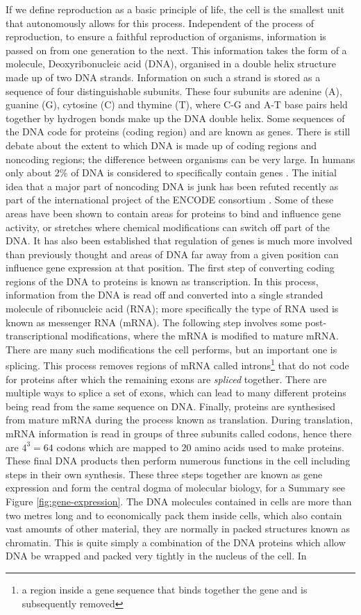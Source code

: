 If we define reproduction as a basic principle of life, the cell is the smallest unit that autonomously allows for this process. Independent of the process of reproduction, to ensure a faithful reproduction of organisms, information is passed on from one generation to the next. This information takes the form of a molecule, Deoxyribonucleic acid (DNA), organised in a double helix structure made up of two DNA strands. Information on such a strand is stored as a sequence of four distinguishable subunits. These four subunits are adenine (A), guanine (G), cytosine (C) and thymine (T), where C-G and A-T base pairs held together by hydrogen bonds make up the DNA double helix. Some sequences of the DNA code for proteins (coding region) and are known as genes.  There is still debate about the extent to which DNA is made up of coding regions and noncoding regions; the difference between organisms can be very large. In humans only about $2\%$ of DNA is considered to specifically contain genes \citep{Elgar:2008dm}. The initial idea that a major part of noncoding DNA is junk has been refuted recently as part of the international project of the ENCODE consortium \citep{Pennisi:2012wl}. Some of these areas have been shown to contain areas for proteins to bind and influence gene activity, or stretches where chemical modifications can  switch off part of the DNA. It has also been established that regulation of genes is much more involved than previously thought and areas of DNA far away from a given position can influence gene expression at that position. The first step of converting coding regions of the DNA to proteins is known as transcription. In this process, information from the DNA is read off and converted into a single stranded molecule of ribonucleic acid (RNA); more specifically the type of RNA used is known as messenger RNA (mRNA). The following step involves some post-transcriptional modifications, where the mRNA is modified to mature mRNA. There are many such modifications the cell performs, but an important one is splicing. This process removes regions of mRNA called introns\footnote{a region inside a gene sequence that binds together the gene and is subsequently removed} that do not code for proteins after which the remaining exons are \emph{spliced} together. There are multiple ways to splice a set of exons, which can lead to many different proteins being read from the same sequence on DNA. Finally, proteins are synthesised from mature mRNA during the process known as translation. During translation, mRNA information is read in groups of three subunits called codons, hence there are $4^3 = 64$ codons which are mapped to $20$ amino acids used to make proteins. These final DNA products then perform numerous functions in the cell including steps in their own synthesis. These three steps together are known as gene expression and form the central dogma of molecular biology, for a Summary see Figure \ref{fig:gene-expression}. The DNA molecules contained in cells are more than two metres long and to economically pack them inside cells, which also contain vast amounts of other material, they are normally in packed structures known as chromatin. This is quite simply a combination of the DNA proteins which allow DNA be wrapped and packed very tightly in the nucleus of the cell. In 